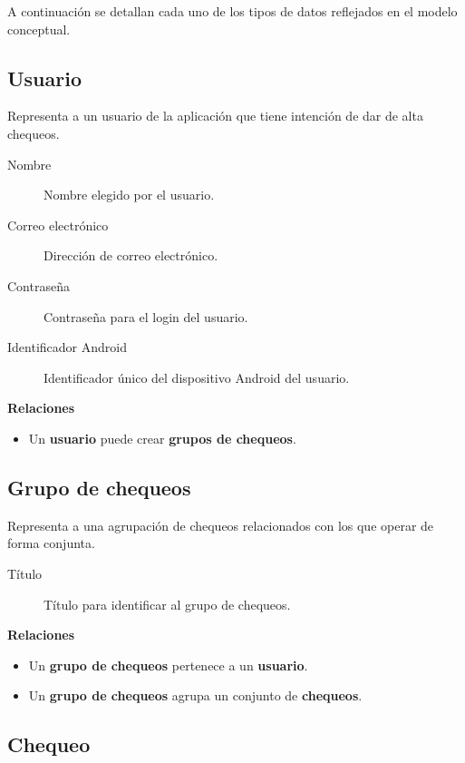 A continuación se detallan cada uno de los tipos de datos reflejados en el
modelo conceptual.

\subsection{Usuario}

Representa a un usuario de la aplicación que tiene intención de dar de alta
chequeos.

\begin{description}
\item[Nombre] Nombre elegido por el usuario.
\item[Correo electrónico] Dirección de correo electrónico.
\item[Contraseña] Contraseña para el login del usuario.
\item[Identificador Android] Identificador único del dispositivo Android del usuario.
\end{description}

\textbf{Relaciones}
\begin{itemize}
\item Un \textbf{usuario} puede crear \textbf{grupos de chequeos}.
\end{itemize}

\subsection{Grupo de chequeos}

Representa a una agrupación de chequeos relacionados con los que operar de forma
conjunta.

\begin{description}
\item[Título] Título para identificar al grupo de chequeos.
\end{description}

\textbf{Relaciones}

\begin{itemize}
\item Un \textbf{grupo de chequeos} pertenece a un \textbf{usuario}.
\item Un \textbf{grupo de chequeos} agrupa un conjunto de \textbf{chequeos}.
\end{itemize}

\subsection{Chequeo}

